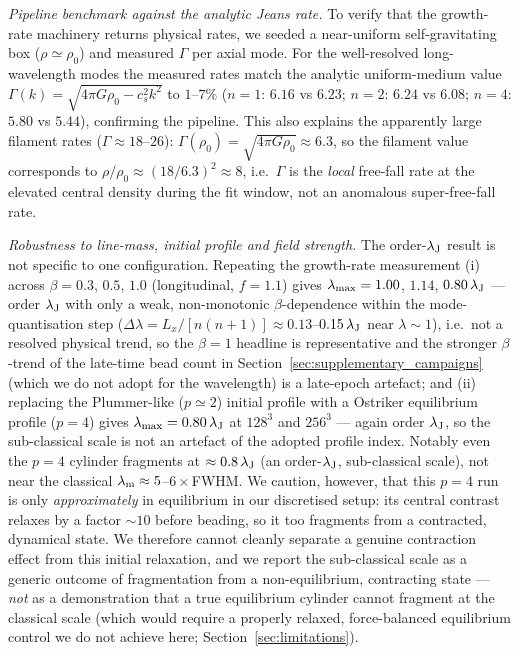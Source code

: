 \documentclass[usenatbib,twoside,twocolumn]{mnras}
\begin{document}
\emph{Pipeline benchmark against the analytic Jeans rate.} To verify that the growth-rate machinery returns physical rates, we seeded a near-uniform self-gravitating box ($\rho\simeq\rho_0$) and measured $\Gamma$ per axial mode. For the well-resolved long-wavelength modes the measured rates match the analytic uniform-medium value $\Gamma(k)=\sqrt{4\pi G\rho_0-c_s^2k^2}$ to $1$--$7\%$ ($n{=}1$: $6.16$ vs $6.23$; $n{=}2$: $6.24$ vs $6.08$; $n{=}4$: $5.80$ vs $5.44$), confirming the pipeline. This also explains the apparently large filament rates ($\Gamma\approx18$--$26$): $\Gamma(\rho_0)=\sqrt{4\pi G\rho_0}\approx6.3$, so the filament value corresponds to $\rho/\rho_0\approx(18/6.3)^2\approx8$, i.e.\ $\Gamma$ is the \emph{local} free-fall rate at the elevated central density during the fit window, not an anomalous super-free-fall rate.

\emph{Robustness to line-mass, initial profile and field strength.} The order-$\lambda_{\rm J}$ result is not specific to one configuration. Repeating the growth-rate measurement (i) across $\beta=0.3$, $0.5$, $1.0$ (longitudinal, $f=1.1$) gives $\lambda_{\rm max}=1.00$, $1.14$, $0.80\,\lambda_{\rm J}$ --- order $\lambda_{\rm J}$ with only a weak, non-monotonic $\beta$-dependence within the mode-quantisation step ($\Delta\lambda=L_x/[n(n{+}1)]\approx0.13$--$0.15\,\lambda_{\rm J}$ near $\lambda\sim1$), i.e.\ not a resolved physical trend, so the $\beta=1$ headline is representative and the stronger $\beta$-trend of the late-time bead count in Section~\ref{sec:supplementary_campaigns} (which we do not adopt for the wavelength) is a late-epoch artefact; and (ii) replacing the Plummer-like ($p\simeq2$) initial profile with a Ostriker equilibrium profile ($p=4$) gives $\lambda_{\rm max}=0.80\,\lambda_{\rm J}$ at $128^3$ and $256^3$ --- again order $\lambda_{\rm J}$, so the sub-classical scale is not an artefact of the adopted profile index. Notably even the $p=4$ cylinder fragments at $\approx0.8\,\lambda_{\rm J}$ (an order-$\lambda_{\rm J}$, sub-classical scale), not near the classical $\lambda_{\rm m}\approx5$--$6\times$FWHM. We caution, however, that this $p=4$ run is only \emph{approximately} in equilibrium in our discretised setup: its central contrast relaxes by a factor $\sim10$ before beading, so it too fragments from a contracted, dynamical state. We therefore cannot cleanly separate a genuine contraction effect from this initial relaxation, and we report the sub-classical scale as a generic outcome of fragmentation from a non-equilibrium, contracting state --- \emph{not} as a demonstration that a true equilibrium cylinder cannot fragment at the classical scale (which would require a properly relaxed, force-balanced equilibrium control we do not achieve here; Section~\ref{sec:limitations}).
\end{document}
